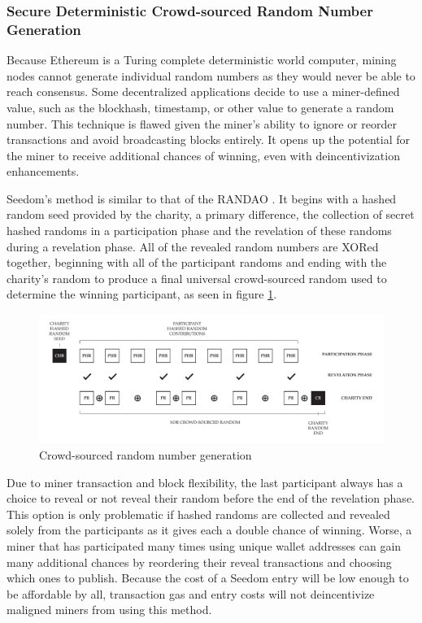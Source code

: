 \documentclass[11pt]{article}
\begin{document}
\subsubsection{Secure Deterministic Crowd-sourced Random Number Generation}

Because Ethereum is a Turing complete deterministic world computer, mining nodes cannot generate individual random numbers as they would never be able to reach consensus. Some decentralized applications decide to use a miner-defined value, such as the blockhash, timestamp, or other value to generate a random number. This technique is flawed given the miner's ability to ignore or reorder transactions and avoid broadcasting blocks entirely. It opens up the potential for the miner to receive additional chances of winning, even with deincentivization enhancements.

Seedom's method is similar to that of the RANDAO \cite{2}. It begins with a hashed random seed provided by the charity, a primary difference, the collection of secret hashed randoms in a participation phase and the revelation of these randoms during a revelation phase. All of the revealed random numbers are XORed together, beginning with all of the participant randoms and ending with the charity's random to produce a final universal crowd-sourced random used to determine the winning participant, as seen in figure \ref{figure:crowdsourcedRandomNumberGeneration}.

\begin{figure}[H]
\begin{center}
\includegraphics[width=1.0\textwidth]{crowdsourcedRandomNumberGeneration.pdf}
\caption{Crowd-sourced random number generation}
\label{figure:crowdsourcedRandomNumberGeneration}
\end{center}
\end{figure}

Due to miner transaction and block flexibility, the last participant always has a choice to reveal or not reveal their random before the end of the revelation phase. This option is only problematic if hashed randoms are collected and revealed solely from the participants as it gives each a double chance of winning. Worse, a miner that has participated many times using unique wallet addresses can gain many additional chances by reordering their reveal transactions and choosing which ones to publish. Because the cost of a Seedom entry will be low enough to be affordable by all, transaction gas and entry costs will not deincentivize maligned miners from using this method.
\end{document}
